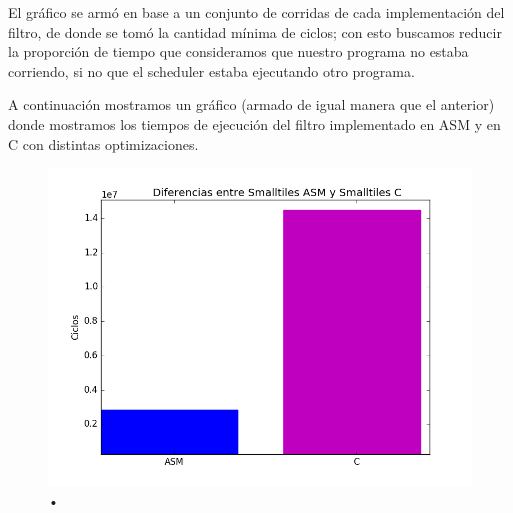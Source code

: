 	El gráfico se armó en base a un conjunto de corridas de cada implementación del filtro, de donde se tomó la cantidad mínima de ciclos; con esto buscamos reducir la proporción de tiempo que consideramos que nuestro programa no estaba corriendo, si no que el scheduler estaba ejecutando otro programa.
	
	A continuación mostramos un gráfico (armado de igual manera que el anterior) donde mostramos los tiempos de ejecución del filtro implementado en ASM y en C con distintas optimizaciones.
	
\begin{figure}[h!]
	\includegraphics[width = 15 cm, height = 10 cm]{imagenes/ASMvsC.png}
\caption{•}
\end{figure}
